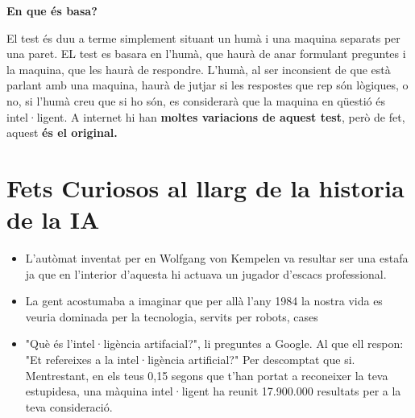\textbf{En que és basa?}

El test és duu a terme simplement situant un humà i una maquina separats per una paret. EL test es basara en l'humà, que haurà de anar formulant preguntes i la maquina, que les haurà de respondre. L'humà, al ser inconsient de que està parlant amb una maquina, haurà de jutjar si les respostes que rep són lògiques, o no, si l'humà creu que si ho són, es considerarà que la maquina en qüestió és intel·ligent. A internet hi han \textbf{moltes variacions de aquest test}, però de fet, aquest \textbf{és el original.} \cite{TurTest} 

\section {Fets Curiosos al llarg de la historia de la IA}

\begin{itemize}
\item L'autòmat inventat per en Wolfgang von Kempelen va resultar ser una estafa ja que en l'interior d'aquesta hi actuava un jugador d'escacs professional.
\item La gent acostumaba a imaginar que per allà l'any 1984 la nostra vida es veuria dominada per la tecnologia, servits per robots, cases
\item "Què és l'intel·ligència artifacial?", li preguntes a Google. Al que ell respon: "Et refereixes a la intel·ligència artificial?" Per descomptat que si. Mentrestant, en els teus 0,15 segons que t'han portat a reconeixer la teva estupidesa, una màquina intel·ligent ha reunit 17.900.000 resultats per a la teva consideració. \cite{InterFacts}
\end{itemize}



